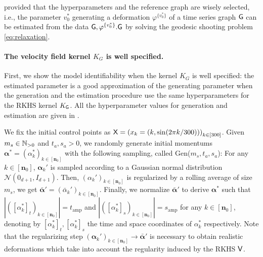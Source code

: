 provided that the hyperparameters and the reference graph are wisely selected, i.e., the parameter $v_0^*$ generating a deformation $\varphi^{\{v_0^*\}}$ of a time series graph $\mathsf{G}$ can be estimated from the data $\mathsf{G},\varphi^{\{v_0^*\}}.\mathsf{G}$ by solving the geodesic shooting problem \eqref{eq:relaxation}. 

\paragraph{The velocity field kernel $K_G$ is well specified.}

First, we show the model identifiability when the kernel $K_G$ is well specified: the estimated parameter is a good approximation of the generating parameter when the generation and the estimation procedure use the same hyperparameters for the RKHS kernel $K_{\mathsf{G}}$.
All the hyperparameter values for generation and estimation are given in .

We fix the initial control points as $\mathsf{X}=\left(x_k=(k,\sin(2\pi k/300))\right)_{k\in[300]} $.
Given $m_{s}\in \mathbb{N}_{>0}$ and $t_{a},s_{a}>0$, we randomly generate initial momentums $\mathbf{\alpha}^*=(\alpha_k^*)_{k\in[\mathbf{n}_0]}$ with the following sampling, called Gen($m_s,t_a,s_a$):
For any $k\in[\mathbf{n}_0]$, $\mathbf{\alpha}_k'$ is sampled according to a Gaussian normal distribution $\mathcal{N}(0_{d+1},I_{d+1})$.
Then, $(\alpha_k')_{k\in[\mathbf{n}_0]}$ is regularized by a rolling average of size $m_{s}$, we get $\bar{\mathbf{\alpha}}'=(\bar{\alpha}_k')_{k\in[\mathbf{n}_0]}$.
Finally, we normalize $\bar{\mathbf{\alpha}}'$ to derive $\mathbf{\alpha}^*$ such that $|([\alpha_k^*]_t)_{k\in[\mathbf{n}_0]}|=t_{\text{amp}}$ and $|([\alpha_k^*]_s)_{k\in[\mathbf{n}_0]}|=s_{\text{amp}}$ for any $k\in[\mathbf{n}_0]$, denoting by $[\alpha_k^*]_t,[\alpha_k^*]_s$ the time and space coordinates of $\alpha_k^*$ respectively.
Note that the regularizing step $(\mathbf{\alpha}_k')_{k\in[\mathbf{n}_0]}\to \bar{\mathbf{\alpha}}' $ is necessary to obtain realistic deformations which take into account the regularity induced by the RKHS $\mathsf{V}$.

